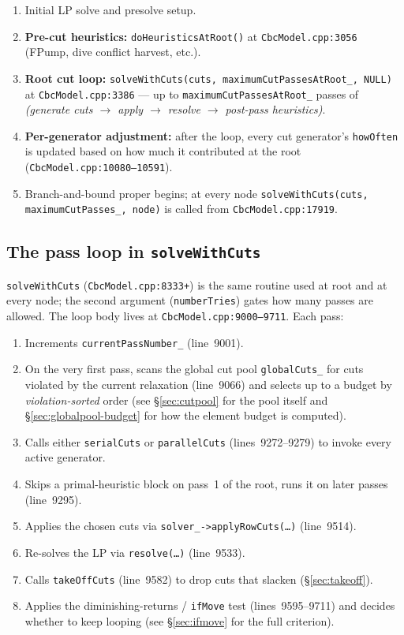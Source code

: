 \documentclass[11pt,a4paper]{article}
\begin{document}
\begin{enumerate}[leftmargin=*]
  \item Initial LP solve and presolve setup.
  \item \textbf{Pre-cut heuristics:} \texttt{doHeuristicsAtRoot()} at
        \texttt{CbcModel.cpp:3056} (FPump, dive conflict harvest, etc.).
  \item \textbf{Root cut loop:}
        \texttt{solveWithCuts(cuts, maximumCutPassesAtRoot\_, NULL)}
        at \texttt{CbcModel.cpp:3386} --- up to
        \texttt{maximumCutPassesAtRoot\_} passes of \emph{(generate
        cuts $\to$ apply $\to$ resolve $\to$ post-pass heuristics)}.
  \item \textbf{Per-generator adjustment:} after the loop, every cut
        generator's \texttt{howOften} is updated based on how much it
        contributed at the root (\texttt{CbcModel.cpp:10080--10591}).
  \item Branch-and-bound proper begins; at every node
        \texttt{solveWithCuts(cuts, maximumCutPasses\_, node)} is
        called from \texttt{CbcModel.cpp:17919}.
\end{enumerate}

\subsection*{The pass loop in \texttt{solveWithCuts}}

\texttt{solveWithCuts} (\texttt{CbcModel.cpp:8333+}) is the same
routine used at root and at every node; the second argument
(\texttt{numberTries}) gates how many passes are allowed.  The
loop body lives at \texttt{CbcModel.cpp:9000--9711}.  Each pass:

\begin{enumerate}[leftmargin=*]
  \item Increments \texttt{currentPassNumber\_} (line~9001).
  \item On the very first pass, scans the global cut pool
        \texttt{globalCuts\_} for cuts violated by the current
        relaxation (line~9066) and selects up to a budget by
        \emph{violation-sorted} order (see \S\ref{sec:cutpool} for
        the pool itself and \S\ref{sec:globalpool-budget} for how
        the element budget is computed).
  \item Calls either \texttt{serialCuts} or \texttt{parallelCuts}
        (lines~9272--9279) to invoke every active generator.
  \item Skips a primal-heuristic block on pass~1 of the root, runs
        it on later passes (line~9295).
  \item Applies the chosen cuts via
        \texttt{solver\_->applyRowCuts(\dots)} (line~9514).
  \item Re-solves the LP via \texttt{resolve(\dots)} (line~9533).
  \item Calls \texttt{takeOffCuts} (line~9582) to drop cuts that
        slacken (\S\ref{sec:takeoff}).
  \item Applies the diminishing-returns / \texttt{ifMove} test
        (lines~9595--9711) and decides whether to keep looping
        (see \S\ref{sec:ifmove} for the full criterion).
\end{enumerate}
\end{document}

